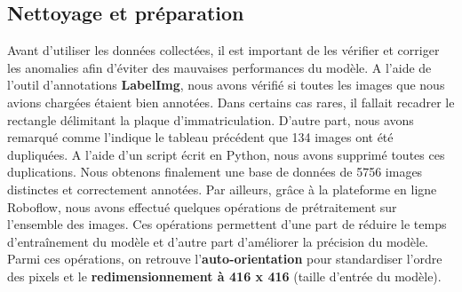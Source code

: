     \subsection{Nettoyage et préparation}
    Avant d’utiliser les données collectées, il est important de les vérifier et corriger les anomalies afin d’éviter des mauvaises performances du modèle. A l’aide de l’outil d’annotations \textbf{LabelImg}, nous avons vérifié si toutes les images que nous avions chargées étaient bien annotées. Dans certains cas rares, il fallait recadrer le rectangle délimitant la plaque d’immatriculation. D’autre part, nous avons remarqué comme l’indique le tableau précédent que 134 images ont été dupliquées. A l’aide d’un script écrit en Python, nous avons supprimé toutes ces duplications. Nous obtenons finalement une base de données de 5756 images distinctes et correctement annotées. Par ailleurs, grâce à la plateforme en ligne Roboflow, nous avons effectué quelques opérations de prétraitement sur l’ensemble des images. Ces opérations permettent d’une part de réduire le temps d’entraînement du modèle et d’autre part d'améliorer la précision du modèle. Parmi ces opérations, on retrouve l’\textbf{auto-orientation} pour standardiser l’ordre des pixels et le \textbf{redimensionnement à 416 x 416} (taille d’entrée du modèle).

